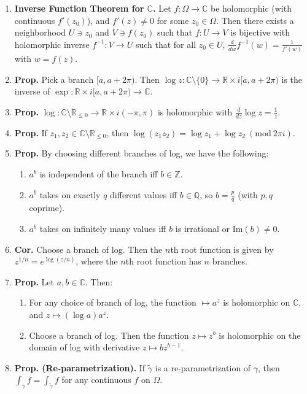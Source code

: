 \documentclass[12pt]{article}
\theoremstyle{definition}
\theoremstyle{named}
\newcommand{\Mod}[1]{\ (\mathrm{mod}\ #1)}
\begin{document}
{\begin{multicols}{2}
\begin{spacing}{1.01}
\begin{enumerate}
    \item \textbf{Inverse Function Theorem for $\mathbb{C}$. } Let $f: \Omega \to \mathbb{C}$ be holomorphic (with continuous $f'(z_0)$), and $f'(z) \neq 0$ for some $z_0 \in \Omega$. Then there exists a neighborhood $U \ni z_0$ and $V \ni f(z_0)$ such that $f: U \to V$ is bijective with holomorphic inverse $f^{-1}: V \to U$ such that for all $z_0 \in U$, $\frac{d}{dw} f^{-1}(w) = \frac{1}{f'(w)}$ with $w = f(z)$. 
    \item \textbf{Prop. } Pick a branch $[a, a+2\pi)$. Then $\log z: \mathbb{C} \setminus \{0\} \to \mathbb{R} \times i[a, a + 2\pi)$ is the inverse of $\exp: \mathbb{R} \times i[a, a+2\pi) \to \mathbb{C}$. 
    \item \textbf{Prop. } $\log: \mathbb{C} \setminus \mathbb{R}_{\leq 0} \to \mathbb{R} \times i(-\pi,\pi)$ is holomorphic with $\frac{d}{dz} \log z = \frac{1}{z}$. 
    \item \textbf{Prop. } If $z_1,z_2 \in \mathbb{C} \setminus \mathbb{R}_{\leq 0}$, then $\log(z_1z_2) = \log z_1 + \log z_2 \Mod{2\pi i}$. 
    \item \textbf{Prop. } By choosing different branches of log, we have the following: 
    \begin{enumerate}
        \item $a^b$ is independent of the branch iff $b \in \mathbb{Z}$. 
        \item $a^b$ takes on exactly $q$ different values iff $b \in \mathbb{Q}$, so $b = \frac{p}{q}$ (with $p,q$ coprime). 
        \item $a^b$ takes on infinitely many values iff $b$ is irrational or $\textrm{Im}(b) \neq 0$. 
    \end{enumerate}
    \item \textbf{Cor. } Choose a branch of log. Then the $n$th root function is given by $z^{1/n} = e^{\log (z/n)}$, where the $n$th root function has $n$ branches. 
    \item \textbf{Prop. } Let $a,b \in \mathbb{C}$. Then: 
    \begin{enumerate}
        \item For any choice of branch of log, the function $\mapsto a^z$ is holomorphic on $\mathbb{C}$, and $z \mapsto (\log a) a^z$. 
        \item Choose a branch of log. Then the function $z \mapsto z^b$ is holomorphic on the domain of log with derivative $z \mapsto bz^{b-1}$. 
    \end{enumerate}
    \item \textbf{Prop. (Re-parametrization). } If $\tilde{\gamma}$ is a re-parametrization of $\gamma$, then $\int_{\gamma} f = \int_{\tilde{\gamma}} f$ for any continuous $f$ on $\Omega$. 

\end{enumerate}
\end{spacing}
\end{multicols}}
\end{document}
